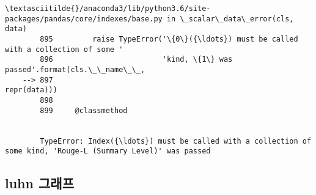 \documentclass[11pt]{article}
\begin{document}
\begin{Verbatim}[commandchars=\\\{\}]
        \textasciitilde{}/anaconda3/lib/python3.6/site-packages/pandas/core/indexes/base.py in \_scalar\_data\_error(cls, data)
        895         raise TypeError('\{0\}({\ldots}) must be called with a collection of some '
        896                         'kind, \{1\} was passed'.format(cls.\_\_name\_\_,
    --> 897                                                       repr(data)))
        898 
        899     @classmethod


        TypeError: Index({\ldots}) must be called with a collection of some kind, 'Rouge-L (Summary Level)' was passed

    \end{Verbatim}

    \hypertarget{luhn-uxadf8uxb798uxd504}{%
\subsection{luhn 그래프}\label{luhn-uxadf8uxb798uxd504}}
\end{document}
